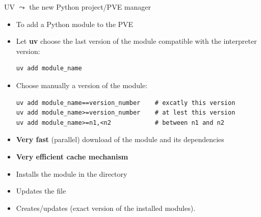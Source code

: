 \documentclass[11pt, serif, mathserif, compress]{beamer}  %
\newcommand{\boldtt}[1]{{\ttfamily\bfseries #1}}
\begin{document}
\begin{frame}[fragile]{UV $\leadsto$ the new Python project/PVE manager}
\vspace*{-3mm}
  \begin{tcolorbox}[title=Command: \boldtt{uv add}, add to width=5mm]
    \begin{itemize}\setlength\itemsep{1mm}
    \item To add a Python module to the PVE
    \item Let \textbf{uv} choose the last version of the module compatible with the interpreter version:
      \begin{verbatim}
uv add module_name
      \end{verbatim}
    \item Choose manually a version of the module:
      \begin{verbatim}
uv add module_name==version_number    # excatly this version
uv add module_name>=version_number    # at lest this version
uv add module_name>=n1,<n2            # between n1 and n2
      \end{verbatim}
    \end{itemize}
  \end{tcolorbox}

      {\small 
        \begin{itemize}\setlength\itemsep{0mm}
        \item<2-> {\bf Very fast} (parallel) download of the module and its dependencies
        \item<2-> {\bf Very efficient cache mechanism}
        \item<3-> Installs the module in the  directory
        \item<4-> Updates the file 
        \item<4-> Creates/updates  (exact version of the installed modules).
        \end{itemize}
      }
\end{frame}
\end{document}
